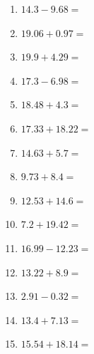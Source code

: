 \documentclass[12pt]{article}
\begin{document}
\begin{center}\end{center}\vspace{0.2cm}
\begin{enumerate}
\item \large $ 14.3 - 9.68 = $ \vspace{1.3cm}
\item \large $ 19.06 + 0.97 = $ \vspace{1.3cm}
\item \large $ 19.9 + 4.29 = $ \vspace{1.3cm}
\item \large $ 17.3 - 6.98 = $ \vspace{1.3cm}
\item \large $ 18.48 + 4.3 = $ \vspace{1.3cm}
\item \large $ 17.33 + 18.22 = $ \vspace{1.3cm}
\item \large $ 14.63 + 5.7 = $ \vspace{1.3cm}
\item \large $ 9.73 + 8.4 = $ \vspace{1.3cm}
\item \large $ 12.53 + 14.6 = $ \vspace{1.3cm}
\item \large $ 7.2 + 19.42 = $ \vspace{1.3cm}
\newpage
\item \large $ 16.99 - 12.23 = $ \vspace{1.5cm}
\item \large $ 13.22 + 8.9 = $ \vspace{1.5cm}
\item \large $ 2.91 - 0.32 = $ \vspace{1.5cm}
\item \large $ 13.4 + 7.13 = $ \vspace{1.5cm}
\item \large $ 15.54 + 18.14 = $ \vspace{1.5cm}

\end{enumerate}
\end{document}
